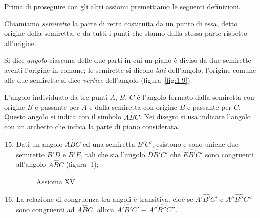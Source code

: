 Prima di proseguire con gli altri assiomi premettiamo le seguenti 
definizioni.
\begin{definizione}
Chiamiamo \emph{semiretta} la parte di retta costituita da un punto 
di essa, detto origine della semiretta, e da tutti i punti che stanno 
dalla stessa parte rispetto all'origine.
\end{definizione}

\begin{center}
 
\end{center}

\begin{definizione}
Si dice \emph{angolo} ciascuna delle due parti in cui un piano è 
diviso da due semirette aventi l'origine in comune; le semirette si 
dicono \emph{lati} dell'angolo; l'origine comune alle due semirette 
si dice \emph{vertice} dell'angolo (figura~\ref{fig:1.9}).
\end{definizione}
\begin{figure*}[bth]
\centering  
\caption{Le semirette \(r\) e \(s\), aventi l'origine \(V\) comune, 
individuano due regioni del piano ognuna delle quali è detta 
\emph{angolo}.}\label{fig:1.9}
\end{figure*}

L'angolo individuato da tre punti \(A\), \(B\), \(C\) è l'angolo formato 
dalla semiretta con origine \(B\) e passante per \(A\) e dalla semiretta 
con origine \(B\) e passante per \(C\). Questo angolo si indica con il 
simbolo \(A\widehat{B}C\). Nei disegni si usa indicare l'angolo con un 
archetto che indica la parte di piano considerata.

\begin{enumerate}[label=\Roman{*}.]
\setcounter{enumi}{14}
\item Dati un angolo \(A\widehat{B}C\) ed una semiretta \(B'C'\), 
esistono e sono uniche due semirette \(B'D\) e \(B'E\), tali che sia 
l'angolo \(D\widehat{B'}C'\) che \(E\widehat{B'}C'\) sono congruenti 
all'angolo \(A\widehat{B}C\) (figura~\ref{fig:1.10});

\begin{inaccessibleblock}
 \begin{figure}[bth]
 \centering 
 \caption{Assioma XV}\label{fig:1.10}
\end{figure}
\end{inaccessibleblock}
\item La relazione di congruenza tra angoli è transitiva, cioè se  
\(A'\widehat{B'}C'\) e  \(A''\widehat{B''}C''\) sono congruenti ad 
\(A\widehat{B}C\), allora  \(A'\widehat{B'}C' \equiv 
A''\widehat{B''}C''\).
\end{enumerate}

